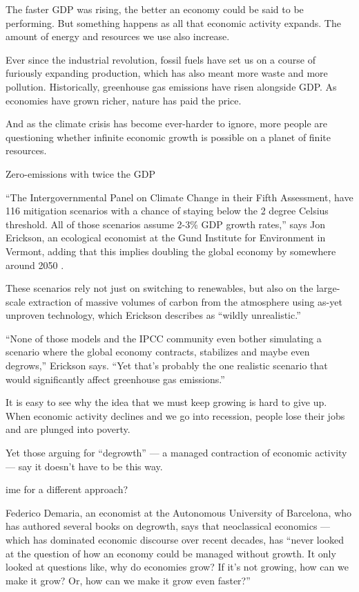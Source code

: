 \documentclass[
]{book}
\begin{document}
The faster GDP was rising, the better an economy could be said to be performing. But something happens as all that economic activity expands. The amount of energy and resources we use also increase.

Ever since the industrial revolution, fossil fuels have set us on a course of furiously expanding production, which has also meant more waste and more pollution. Historically, greenhouse gas emissions have risen alongside GDP. As economies have grown richer, nature has paid the price.

And as the climate crisis has become ever-harder to ignore, more people are questioning whether infinite economic growth is possible on a planet of finite resources.

Zero-emissions with twice the GDP

``The Intergovernmental Panel on Climate Change in their Fifth Assessment, have 116 mitigation scenarios with a chance of staying below the 2 degree Celsius threshold. All of those scenarios assume 2-3\% GDP growth rates,'' says Jon Erickson, an ecological economist at the Gund Institute for Environment in Vermont, adding that this implies doubling the global economy by somewhere around 2050 .

These scenarios rely not just on switching to renewables, but also on the large-scale extraction of massive volumes of carbon from the atmosphere using as-yet unproven technology, which Erickson describes as ``wildly unrealistic.''

``None of those models and the IPCC community even bother simulating a scenario where the global economy contracts, stabilizes and maybe even degrows,'' Erickson says. ``Yet that's probably the one realistic scenario that would significantly affect greenhouse gas emissions.''

It is easy to see why the idea that we must keep growing is hard to give up. When economic activity declines and we go into recession, people lose their jobs and are plunged into poverty.

Yet those arguing for ``degrowth'' --- a managed contraction of economic activity--- say it doesn't have to be this way.

ime for a different approach?

Federico Demaria, an economist at the Autonomous University of Barcelona, who has authored several books on degrowth, says that neoclassical economics --- which has dominated economic discourse over recent decades, has ``never looked at the question of how an economy could be managed without growth. It only looked at questions like, why do economies grow? If it's not growing, how can we make it grow? Or, how can we make it grow even faster?''
\end{document}
